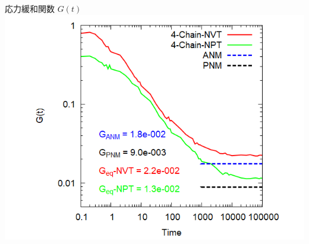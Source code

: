 \documentclass[12pt, dvipdfmx]{beamer}
\begin{document}
\begin{frame}
\begin{columns}[T, onlytextwidth]
\begin{block}{応力緩和関数 $G(t)$}
					\includegraphics[width=\textwidth]{gt_4chain_comp.png}
				\end{block}
		\end{columns}
\end{frame}

\end{document}
